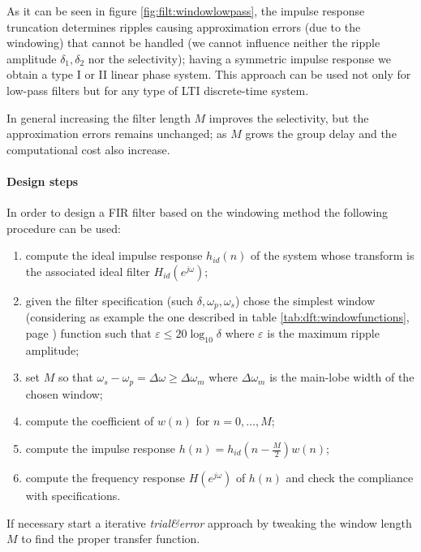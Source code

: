 		As it can be seen in figure \ref{fig:filt:windowlowpass}, the impulse response truncation determines ripples causing approximation errors (due to the windowing) that cannot be handled (we cannot influence neither the ripple amplitude $\delta_1,\delta_2$ nor the selectivity); having a symmetric impulse response we obtain a type I or II linear phase system. This approach can be used not only for low-pass filters but for any type of LTI discrete-time system.
	
		In general increasing the filter length $M$ improves the selectivity, but the approximation errors remains unchanged; as $M$ grows the group delay and the computational cost also increase.
		
		\paragraph{Design steps} In order to design a FIR filter based on the windowing method the following procedure can be used:
		\begin{enumerate}
			\item compute the ideal impulse response $h_{id}(n)$ of the system whose transform is the associated ideal filter $H_{id}(e^{j\omega})$;
			
			\item given the filter specification (such $\delta,\omega_p,\omega_s$) chose the simplest window (considering as example the one described in table \ref{tab:dft:windowfunctions}, page \pageref{tab:dft:windowfunctions}) function such that $\varepsilon \leq 20 \log_{10} \delta$ where $\varepsilon$ is the maximum ripple amplitude;
			
			\item set  $M$ so that $\omega_s-\omega_p = \Delta \omega \geq \Delta \omega_m$ where $\Delta \omega_m$ is the main-lobe width of the chosen window;
			
			\item compute the coefficient of $w(n)$ for $n=0,\dots,M$;
			\item compute the impulse response $h(n) = h_{id}\left( n - \frac M2\right) w(n)$;
			\item compute the frequency response $H(e^{j\omega})$ of $h(n)$ and check the compliance with specifications.			
		\end{enumerate}
		If necessary start a iterative \textit{trial\&error} approach by tweaking the window length $M$ to find the proper transfer function.
	
